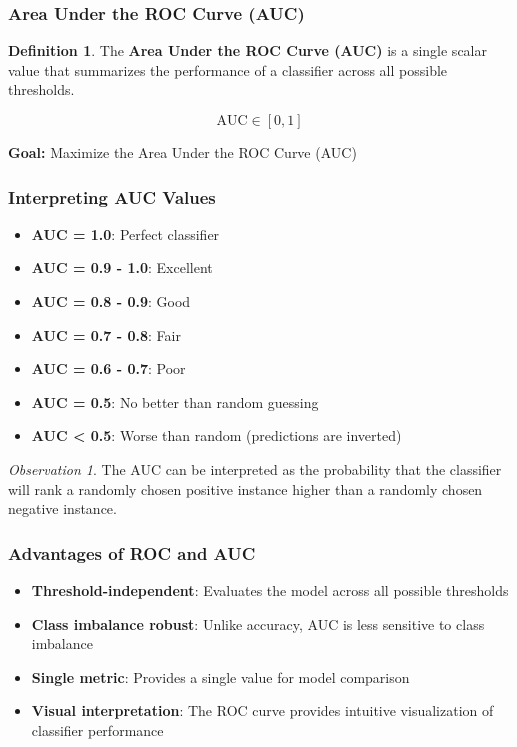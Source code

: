 \documentclass[11pt,a4paper]{article}
\theoremstyle{definition}
\newtheorem{definition}{Definition}[section]
\theoremstyle{plain}
\theoremstyle{remark}
\newtheorem*{observation}{Observation}
\begin{document}
\subsubsection{Area Under the ROC Curve (AUC)}

\begin{definition}
The \textbf{Area Under the ROC Curve (AUC)} is a single scalar value that summarizes the performance of a classifier across all possible thresholds.

\begin{equation}
\text{AUC} \in [0, 1]
\end{equation}
\end{definition}

\begin{center}
\colorbox{orange!15}{\parbox{0.85\textwidth}{
\centering
\textbf{Goal:} Maximize the Area Under the ROC Curve (AUC)
}}
\end{center}

\subsubsection{Interpreting AUC Values}

\begin{itemize}
    \item \textbf{AUC = 1.0}: Perfect classifier
    \item \textbf{AUC = 0.9 - 1.0}: Excellent
    \item \textbf{AUC = 0.8 - 0.9}: Good
    \item \textbf{AUC = 0.7 - 0.8}: Fair
    \item \textbf{AUC = 0.6 - 0.7}: Poor
    \item \textbf{AUC = 0.5}: No better than random guessing
    \item \textbf{AUC < 0.5}: Worse than random (predictions are inverted)
\end{itemize}

\begin{observation}
The AUC can be interpreted as the probability that the classifier will rank a randomly chosen positive instance higher than a randomly chosen negative instance.
\end{observation}

\subsubsection{Advantages of ROC and AUC}

\begin{itemize}
    \item \textbf{Threshold-independent}: Evaluates the model across all possible thresholds
    \item \textbf{Class imbalance robust}: Unlike accuracy, AUC is less sensitive to class imbalance
    \item \textbf{Single metric}: Provides a single value for model comparison
    \item \textbf{Visual interpretation}: The ROC curve provides intuitive visualization of classifier performance
\end{itemize}
\end{document}
